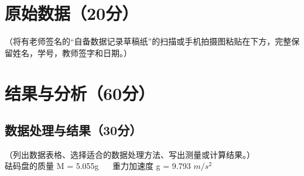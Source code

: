 \documentclass[]{../../templates/Report}%
\begin{document}
\begin{fullreportonly}
\section{原始数据（20分）}
（将有老师签名的“自备数据记录草稿纸”的扫描或手机拍摄图粘贴在下方，完整保留姓名，学号，教师签字和日期。）

\section{结果与分析（60分）}
\subsection{数据处理与结果（30分）}
（列出数据表格、选择适合的数据处理方法、写出测量或计算结果。） \\
砝码盘的质量 M = 5.055g $\quad$ 重力加速度 g = 9.793 $m/s^2$

\end{fullreportonly}
\end{document}
